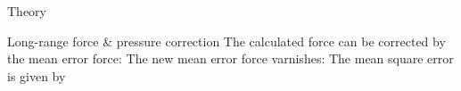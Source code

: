 \documentclass[final,hyperref={pdfpagelabels=false},fleqn]{beamer}
\begin{document}
\begin{frame}{}
\begin{columns}[t]
\begin{column}{.48\linewidth}
\begin{block}{Theory}
      \end{block}
      \vspace{.3ex}
      \begin{block}{Long-range force \& pressure correction}
        The calculated force can be corrected by the mean error force:
        The new mean error force varnishes:
        The mean square error is given by

\end{block}
\end{column}
\end{columns}
\end{frame}
\end{document}

